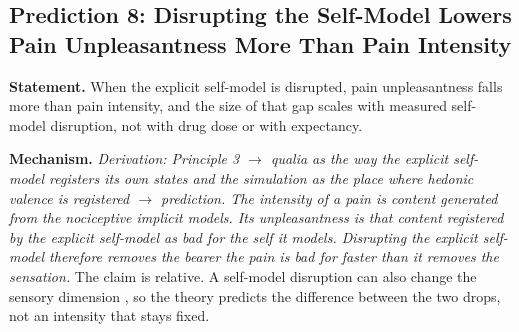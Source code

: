\documentclass[12pt]{article}
\begin{document}
\subsection{Prediction 8: Disrupting the Self-Model Lowers Pain Unpleasantness More Than Pain Intensity}

\textbf{Statement.} When the explicit self-model is disrupted, pain unpleasantness falls more than pain intensity, and the size of that gap scales with measured self-model disruption, not with drug dose or with expectancy.

\textbf{Mechanism.} \emph{Derivation: Principle 3 $\rightarrow$ qualia as the way the explicit self-model registers its own states and the simulation as the place where hedonic valence is registered $\rightarrow$ prediction. The intensity of a pain is content generated from the nociceptive implicit models. Its unpleasantness is that content registered by the explicit self-model as bad for the self it models. Disrupting the explicit self-model therefore removes the bearer the pain is bad for faster than it removes the sensation.} The claim is relative. A self-model disruption can also change the sensory dimension \citep{Roder2007,Riegner2023}, so the theory predicts the difference between the two drops, not an intensity that stays fixed.
\end{document}
